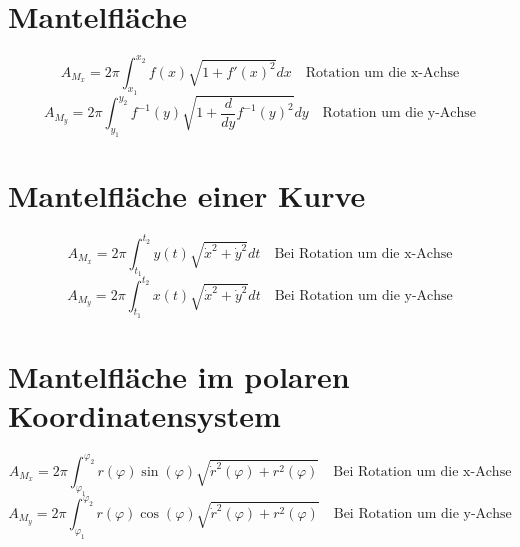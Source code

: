\section{Mantelfläche}
\[ \boxed{A_{M_x} = 2 \pi \int_{x_1}^{x_2}f(x) \sqrt{1 + f'(x)^2} dx} \quad \text{Rotation um die x-Achse} \]
\[ \boxed{A_{M_y} = 2 \pi \int_{y_1}^{y_2}f^{-1}(y) \sqrt{1 + \frac{d}{dy}f^{-1}(y)^2} dy} \quad \text{Rotation um die y-Achse} \]

\section{Mantelfläche einer Kurve}
\[ \boxed{A_{M_x} = 2 \pi \int_{t_1}^{t_2} y(t) \sqrt{\dot{x}^2 + \dot{y}^2}dt} \quad \text{Bei Rotation um die x-Achse} \]
\[ \boxed{A_{M_y} = 2 \pi \int_{t_1}^{t_2} x(t) \sqrt{\dot{x}^2 + \dot{y}^2}dt} \quad \text{Bei Rotation um die y-Achse} \]

\section{Mantelfläche im polaren Koordinatensystem}
\[ \boxed{A_{M_x} = 2 \pi \int_{\varphi_1}^{\varphi_2}r(\varphi) \sin(\varphi)\sqrt{\dot{r}^2(\varphi) + r^2(\varphi)}} \quad \text{Bei Rotation um die x-Achse} \]
\[ \boxed{A_{M_y} = 2 \pi \int_{\varphi_1}^{\varphi_2}r(\varphi) \cos(\varphi)\sqrt{\dot{r}^2(\varphi) + r^2(\varphi)}} \quad \text{Bei Rotation um die y-Achse} \]
